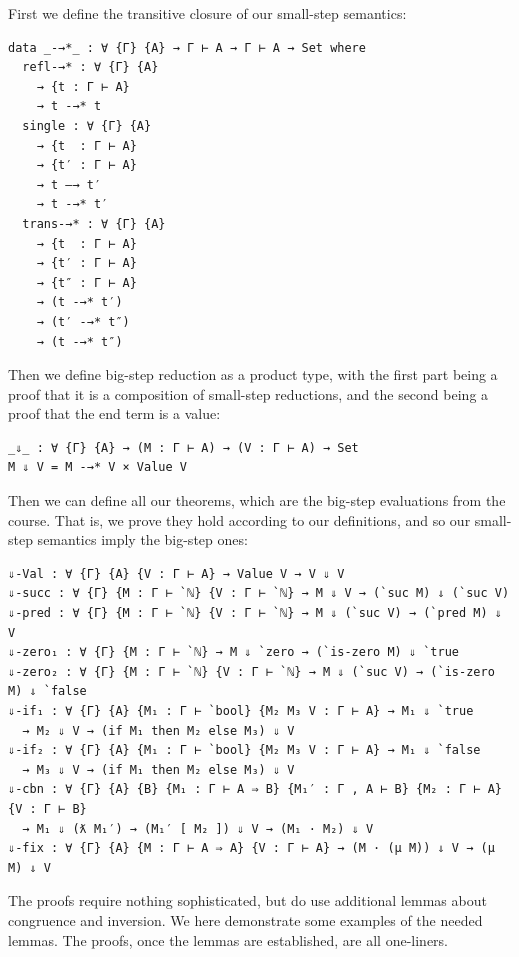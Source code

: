 \documentclass[12pt,a4paper,twoside,openright]{report}
\begin{document}
First we define the transitive closure of our small-step semantics:
\begin{multicols}{3}
\begin{verbatim}
data _-→*_ : ∀ {Γ} {A} → Γ ⊢ A → Γ ⊢ A → Set where
  refl-→* : ∀ {Γ} {A}
    → {t : Γ ⊢ A}
    → t -→* t
  single : ∀ {Γ} {A}
    → {t  : Γ ⊢ A}
    → {t′ : Γ ⊢ A}
    → t —→ t′
    → t -→* t′
  trans-→* : ∀ {Γ} {A}
    → {t  : Γ ⊢ A}
    → {t′ : Γ ⊢ A}
    → {t″ : Γ ⊢ A}
    → (t -→* t′)
    → (t′ -→* t″)
    → (t -→* t″)
\end{verbatim}
\end{multicols}
Then we define big-step reduction as a product type, with the first part being a proof that it is a composition of small-step reductions, and the second being a proof that the end term is a value:
\begin{verbatim}
_⇓_ : ∀ {Γ} {A} → (M : Γ ⊢ A) → (V : Γ ⊢ A) → Set
M ⇓ V = M -→* V × Value V 
\end{verbatim}
Then we can define all our theorems, which are the big-step evaluations from the course. That is, we prove they hold according to our definitions, and so our small-step semantics imply the big-step ones:
\begin{verbatim}
⇓-Val : ∀ {Γ} {A} {V : Γ ⊢ A} → Value V → V ⇓ V
⇓-succ : ∀ {Γ} {M : Γ ⊢ `ℕ} {V : Γ ⊢ `ℕ} → M ⇓ V → (`suc M) ⇓ (`suc V)
⇓-pred : ∀ {Γ} {M : Γ ⊢ `ℕ} {V : Γ ⊢ `ℕ} → M ⇓ (`suc V) → (`pred M) ⇓ V
⇓-zero₁ : ∀ {Γ} {M : Γ ⊢ `ℕ} → M ⇓ `zero → (`is-zero M) ⇓ `true
⇓-zero₂ : ∀ {Γ} {M : Γ ⊢ `ℕ} {V : Γ ⊢ `ℕ} → M ⇓ (`suc V) → (`is-zero M) ⇓ `false
⇓-if₁ : ∀ {Γ} {A} {M₁ : Γ ⊢ `bool} {M₂ M₃ V : Γ ⊢ A} → M₁ ⇓ `true
  → M₂ ⇓ V → (if M₁ then M₂ else M₃) ⇓ V
⇓-if₂ : ∀ {Γ} {A} {M₁ : Γ ⊢ `bool} {M₂ M₃ V : Γ ⊢ A} → M₁ ⇓ `false 
  → M₃ ⇓ V → (if M₁ then M₂ else M₃) ⇓ V
⇓-cbn : ∀ {Γ} {A} {B} {M₁ : Γ ⊢ A ⇒ B} {M₁′ : Γ , A ⊢ B} {M₂ : Γ ⊢ A} {V : Γ ⊢ B} 
  → M₁ ⇓ (ƛ M₁′) → (M₁′ [ M₂ ]) ⇓ V → (M₁ · M₂) ⇓ V 
⇓-fix : ∀ {Γ} {A} {M : Γ ⊢ A ⇒ A} {V : Γ ⊢ A} → (M · (μ M)) ⇓ V → (μ M) ⇓ V
\end{verbatim}
The proofs require nothing sophisticated, but do use additional lemmas about congruence and inversion. We here demonstrate some examples of the needed lemmas. The proofs, once the lemmas are established, are all one-liners. 
\end{document}
